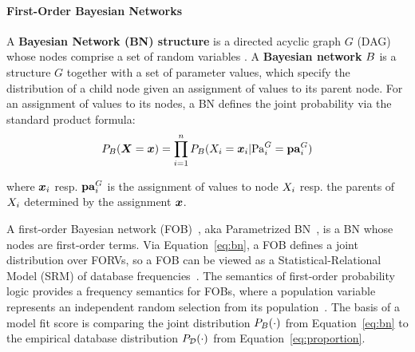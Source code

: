 \documentclass{article}
\begin{document}
\paragraph{First-Order Bayesian Networks}

A {\bf Bayesian Network (BN) structure} is a directed acyclic graph $G$ (DAG) whose nodes comprise a set of random variables \cite{Pearl1988}. 
A \textbf{Bayesian network} $B$ is a structure $G$ together with a set of parameter values, which
 specify the distribution of a child node given an assignment of values to its parent node. For an assignment of values to its nodes, a BN defines the joint probability via the standard product formula:
%
\vspace{-5pt}
\begin{equation} \label{eq:bn}
P_{B}(\boldsymbol{X} = \boldsymbol{x}) = \prod_{i=1}^{n}  
P_{B}(X_{i} = \boldsymbol{x}_{i}|
\mathrm{Pa}_{i}^{G} = \mathbf{pa}_{i}^{G}
)
\end{equation}

where $\boldsymbol{x}_{i}$ resp. $\mathbf{pa}_{i}^{G}$ is the assignment of values to node $X_{i}$ resp. the parents of $X_{i}$ determined by the assignment $\boldsymbol{x}$. 





A first-order Bayesian network (FOB)~\cite{Wang2008}, aka Parametrized BN~\cite{Kimmig2014}, is a BN whose nodes are first-order terms.  Via Equation~\eqref{eq:bn}, a FOB defines a joint distribution over FORVs, so a FOB can be viewed as a Statistical-Relational Model (SRM) of database frequencies~\cite{Getoor2001a}. 
The semantics of first-order probability logic provides a frequency semantics for FOBs, where a population variable represents an independent random selection from its population~\cite{Halpern90,Schulte2014}. 
The basis of a model fit score is comparing the joint distribution $P_{B}(\cdot)$ from Equation~\eqref{eq:bn} to the empirical database distribution $P_{\mathcal{D}}(\cdot)$ from Equation~\eqref{eq:proportion}.
\end{document}
